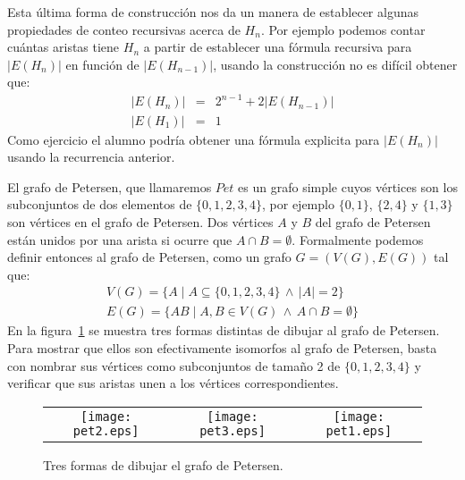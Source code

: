 \begin{ejemplo}[El Hipercubo.]
Esta última forma de construcción nos da un manera de establecer algunas propiedades de conteo recursivas acerca de $H_n$.
Por ejemplo podemos contar cuántas aristas tiene $H_n$ a partir de establecer una fórmula recursiva para $|E(H_n)|$ en función de $|E(H_{n-1})|$, usando la construcción no es difícil obtener que:
\[
\begin{array}{rcl}
|E(H_n)|&=&2^{n-1}+2|E(H_{n-1})| \\
|E(H_1)|&=&1
\end{array}
\]
Como ejercicio el alumno podría obtener una fórmula explicita para $|E(H_n)|$ usando la recurrencia anterior.
\end{ejemplo}

\begin{ejemplo}
El grafo de Petersen, que llamaremos $Pet$ es un grafo simple cuyos vértices son los subconjuntos de dos elementos de $\{0,1,2,3,4\}$, por ejemplo $\{0,1\}$, $\{2,4\}$ y $\{1,3\}$ son vértices en el grafo de Petersen.
Dos vértices $A$ y $B$ del grafo de Petersen están unidos por una arista si ocurre que $A\cap B=\emptyset$.
Formalmente podemos definir entonces al grafo de Petersen, como un grafo $G=(V(G),E(G))$ tal que:
\[
\begin{array}{l}
V(G)=\{A\;|\;A\subseteq \{0,1,2,3,4\}\,\wedge\, |A|=2\} \\
E(G)=\{AB\;|\;A,B\in V(G)\,\wedge\, A\cap B=\emptyset\}
\end{array}
\]
En la figura~\ref{fig:petersen} se muestra tres formas distintas de dibujar al grafo de Petersen.
Para mostrar que ellos son efectivamente isomorfos al grafo de Petersen, basta con nombrar sus vértices como subconjuntos de tamaño 2 de $\{0,1,2,3,4\}$ y verificar que sus aristas unen a los vértices correspondientes.
\begin{figure}[h!]
\centering
\begin{tabular}{ccc}
  \texttt{[image: pet2.eps]} \hspace*{1cm}&
  \texttt{[image: pet3.eps]} & \hspace*{1cm}
  \texttt{[image: pet1.eps]} 
  \end{tabular}
\caption{Tres formas de dibujar el grafo de Petersen.}
\label{fig:petersen}
\end{figure}


\end{ejemplo}
